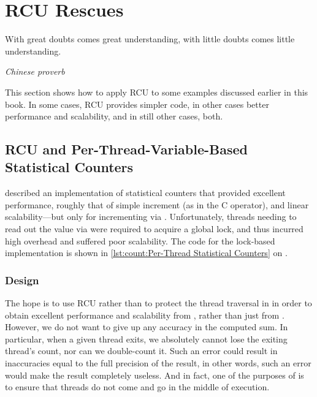 
\section{RCU Rescues}
\label{sec:together:RCU Rescues}
%
\epigraph{With great doubts comes great understanding, with little doubts
	  comes little understanding.}
	 {\emph{Chinese proverb}}

This section shows how to apply RCU to some examples discussed earlier
in this book.
In some cases, RCU provides simpler code, in other cases better
performance and scalability, and in still other cases, both.

\subsection{RCU and Per-Thread-Variable-Based Statistical Counters}
\label{sec:together:RCU and Per-Thread-Variable-Based Statistical Counters}

described an implementation of statistical counters that provided
excellent
performance, roughly that of simple increment (as in the C \co{++}
operator), and linear scalability---but only for incrementing
via .
Unfortunately, threads needing to read out the value via 
were required to acquire a global
lock, and thus incurred high overhead and suffered poor scalability.
The code for the lock-based implementation is shown in
\cref{lst:count:Per-Thread Statistical Counters} on
.

\QuickQuizEnd

\subsubsection{Design}

The hope is to use RCU rather than  to protect the
thread traversal in  in order to obtain excellent
performance and scalability from , rather than just
from .
However, we do not want to give up any accuracy in the computed sum.
In particular, when a given thread exits, we absolutely cannot
lose the exiting thread's count, nor can we double-count it.
Such an error could result in inaccuracies equal to the full
precision of the result, in other words, such an error would
make the result completely useless.
And in fact, one of the purposes of  is to
ensure that threads do not come and go in the middle of 
execution.

